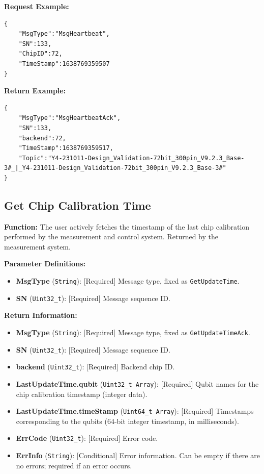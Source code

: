 \documentclass[12pt, a4paper]{article}
\begin{document}
\noindent \textbf{Request Example:}
\begin{lstlisting}
{
    "MsgType":"MsgHeartbeat",
    "SN":133,
    "ChipID":72,
    "TimeStamp":1638769359507
}
\end{lstlisting}

\noindent \textbf{Return Example:}
\begin{lstlisting}
{
    "MsgType":"MsgHeartbeatAck",
    "SN":133,
    "backend":72,
    "TimeStamp":1638769359517,
    "Topic":"Y4-231011-Design_Validation-72bit_300pin_V9.2.3_Base-3#_|_Y4-231011-Design_Validation-72bit_300pin_V9.2.3_Base-3#"
}
\end{lstlisting}

\subsection{Get Chip Calibration Time}

\textbf{Function:} The user actively fetches the timestamp of the last chip calibration performed by the measurement and control system. Returned by the measurement system.

\textbf{Parameter Definitions:}
\begin{itemize}
    \item \textbf{MsgType} (\texttt{String}): [Required] Message type, fixed as \texttt{GetUpdateTime}.
    \item \textbf{SN} (\texttt{Uint32\_t}): [Required] Message sequence ID.
\end{itemize}

\textbf{Return Information:}
\begin{itemize}
    \item \textbf{MsgType} (\texttt{String}): [Required] Message type, fixed as \texttt{GetUpdateTimeAck}.
    \item \textbf{SN} (\texttt{Uint32\_t}): [Required] Message sequence ID.
    \item \textbf{backend} (\texttt{Uint32\_t}): [Required] Backend chip ID.
    \item \textbf{LastUpdateTime.qubit} (\texttt{Uint32\_t Array}): [Required] Qubit names for the chip calibration timestamp (integer data).
    \item \textbf{LastUpdateTime.timeStamp} (\texttt{Uint64\_t Array}): [Required] Timestamps corresponding to the qubits (64-bit integer timestamp, in milliseconds).
    \item \textbf{ErrCode} (\texttt{Uint32\_t}): [Required] Error code.
    \item \textbf{ErrInfo} (\texttt{String}): [Conditional] Error information. Can be empty if there are no errors; required if an error occurs.
\end{itemize}
\end{document}
